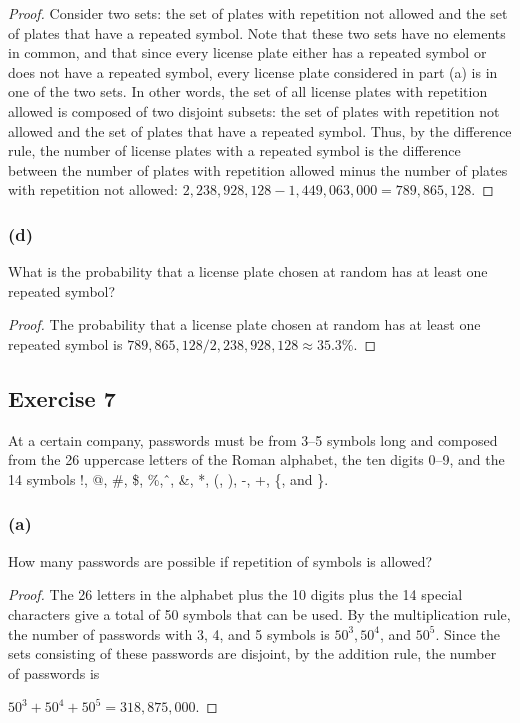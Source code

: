 \documentclass[14pt]{extarticle}
\begin{document}
\begin{proof}
Consider two sets: the set of plates with repetition not allowed and the set of plates that have a repeated symbol. 
Note that these two sets have no elements in common, and that since every license plate either has a repeated symbol 
or does not have a repeated symbol, every license plate considered in part (a) is in one of the two sets. In other 
words, the set of all license plates with repetition allowed is composed of two disjoint subsets: the set of 
plates with repetition not allowed and the set of plates that have a repeated symbol. Thus, by the difference rule, 
the number of license plates with a repeated symbol is the difference between the number of plates with repetition 
allowed minus the number of plates with repetition not allowed: \(2,238,928,128 - 1,449,063,000 = 789,865,128\).
\end{proof}

\subsubsection{(d)}
What is the probability that a license plate chosen at random has at least one repeated symbol?

\begin{proof}
The probability that a license plate chosen at random has at least one repeated symbol is 
\(789,865,128 / 2,238,928,128 \approx 35.3\%\).
\end{proof}

\subsection{Exercise 7}
At a certain company, passwords must be from 3–5 symbols long and composed from the 26 uppercase letters of the 
Roman alphabet, the ten digits 0–9, and the 14 symbols !, @, \#, \$, \%, \^\,, \&, *, (, ), -, +, \{, and \}.

\subsubsection{(a)}
How many passwords are possible if repetition of symbols is allowed?

\begin{proof}
The 26 letters in the alphabet plus the 10 digits plus the 14 special characters give a total of 50 symbols that can 
be used. By the multiplication rule, the number of passwords with 3, 4, and 5 symbols is \(50^3, 50^4\), and 
\(50^5\). Since the sets consisting of these passwords are disjoint, by the addition rule, the number of passwords is 

\(50^3 + 50^4 + 50^5 = 318,875,000\).
\end{proof}
\end{document}
